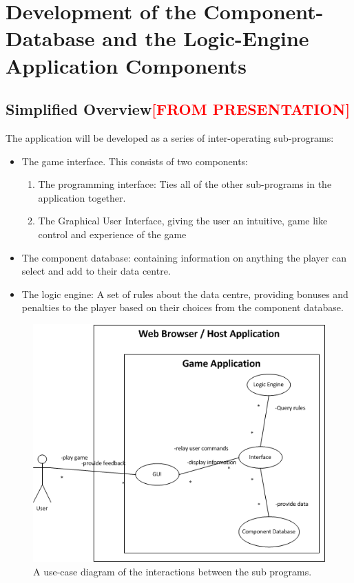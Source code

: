 \iffalse

\section{Development of the Component-Database and the Logic-Engine Application Components}
\label{sec:DevelopmentOfTheComponentDatabaseAndTheLogicEngineApplicationComponents}


\subsection{Simplified Overview\textcolor{red}{[FROM PRESENTATION]}}
\label{sec:Methodology:SimplifiedOverview}
The application will be developed as a series of inter-operating sub-programs:

\begin{itemize}
\item The game interface.
    This consists of two components:
\begin{enumerate}
\item The programming interface: Ties all of the other sub-programs in the application together.

\item The Graphical User Interface, giving the user an intuitive, game like control and experience of the game
\end{enumerate}
\item The component database: containing information on anything the player can select and add to their data centre. 

\item The logic engine: A set of rules about the data centre, providing bonuses and penalties to the player based on their choices from the component database.
\end{itemize}

\begin{figure}[H]
\centering
\includegraphics[width=5in]{Resources//Use Case Diagram.png}
\caption{A use-case diagram of the interactions between the sub programs.}
\label{fig:UseCaseDiagram}
\end{figure}

